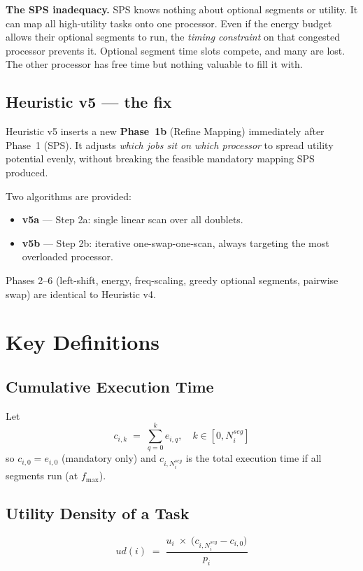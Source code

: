 \documentclass[10pt,twocolumn]{article}
\begin{document}
\begin{yellowbox}
\textbf{The SPS inadequacy.}
SPS knows nothing about optional segments or utility. It can map all
high-utility tasks onto one processor. Even if the energy budget allows their
optional segments to run, the \emph{timing constraint} on that congested
processor prevents it. Optional segment time slots compete, and many are lost.
The other processor has free time but nothing valuable to fill it with.
\end{yellowbox}

\subsection{Heuristic v5 --- the fix}

Heuristic v5 inserts a new \textbf{Phase~1b} (Refine Mapping) immediately
after Phase~1 (SPS). It adjusts \emph{which jobs sit on which processor}
to spread utility potential evenly, without breaking the feasible mandatory
mapping SPS produced.

Two algorithms are provided:
\begin{itemize}[nosep]
  \item \textbf{v5a} --- Step 2a: single linear scan over all doublets.
  \item \textbf{v5b} --- Step 2b: iterative one-swap-one-scan, always
        targeting the most overloaded processor.
\end{itemize}
Phases 2--6 (left-shift, energy, freq-scaling, greedy optional segments,
pairwise swap) are identical to Heuristic v4.

\section{Key Definitions}

\subsection{Cumulative Execution Time}
Let
\[
  c_{i,k} \;=\; \sum_{q=0}^{k} e_{i,q}, \quad k \in [0, N_i^{seg}]
\]
so $c_{i,0} = e_{i,0}$ (mandatory only) and $c_{i,N_i^{seg}}$ is the total
execution time if all segments run (at $f_{\max}$).

\subsection{Utility Density of a Task}
\begin{bluebox}
\[
  ud(i) \;=\; \frac{u_i \;\times\; \bigl(c_{i,N_i^{seg}} - c_{i,0}\bigr)}{p_i}
\]
\end{bluebox}
\end{document}
